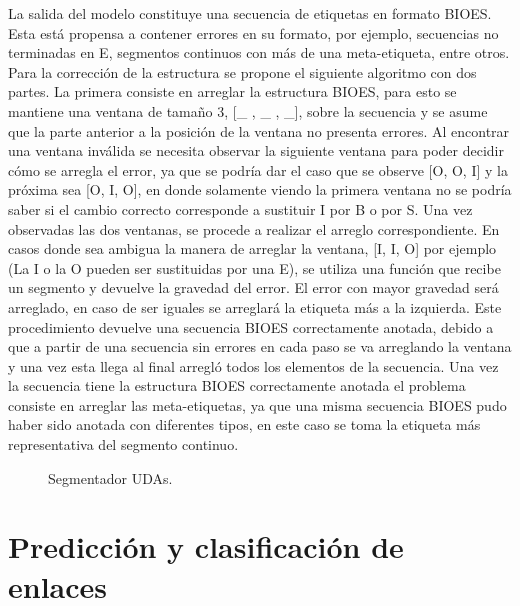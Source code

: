 La salida del modelo constituye una secuencia de etiquetas en formato BIOES. Esta está propensa
a contener errores en su formato, por ejemplo, secuencias no terminadas en E, segmentos continuos con más de una 
meta-etiqueta, entre otros.
Para la corrección de la estructura se propone el siguiente algoritmo con dos partes. La primera
consiste en arreglar la estructura BIOES, para esto se mantiene una ventana de tamaño
3, [\_ , \_ , \_], sobre la secuencia y se asume que la parte anterior a la posición de la ventana no presenta errores. Al encontrar una
ventana inválida se necesita observar la siguiente ventana para poder decidir cómo se arregla el error, ya que se
podría dar el caso que se observe [O, O, I] y la próxima sea [O, I, O], en donde solamente viendo la primera ventana no se podría saber si el cambio 
correcto corresponde a sustituir I por B o por S. Una vez observadas las dos ventanas, se procede a realizar el 
arreglo correspondiente. En casos donde sea ambigua la manera de arreglar la ventana, [I, I, O] por ejemplo
(La I o la O pueden ser 
sustituidas por una E), se utiliza una función que recibe un segmento y devuelve la gravedad del error.
El error con mayor gravedad será arreglado, en caso de ser iguales se arreglará la etiqueta más a la izquierda.
Este procedimiento devuelve una secuencia BIOES correctamente anotada, debido a que a partir de una secuencia sin 
errores en cada paso se va arreglando la ventana y una vez esta llega al final arregló todos los elementos de la secuencia.
Una vez la secuencia tiene la estructura BIOES correctamente anotada el problema
consiste en arreglar las meta-etiquetas, ya que una misma secuencia BIOES pudo haber sido anotada con diferentes
tipos, en este caso se toma la etiqueta más representativa del segmento continuo.

\begin{figure}[p]
	\begin{center}
		\begin{center}
            
        \end{center}
	    \caption{Segmentador UDAs.}\label{fig:segmenter_model}
	\end{center}
\end{figure}

\newpage

\section{Predicción y clasificación de enlaces}

